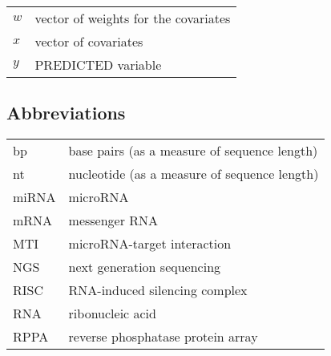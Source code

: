 \documentclass[english,12pt,a4paper,pdftex,elec,utf8]{aaltothesis}
\begin{document}
\begin{tabular}{ll}
$w$ & vector of weights for the covariates \\
$x$ & vector of covariates \\
$y$ & PREDICTED variable
\end{tabular}



\subsection*{Abbreviations}

\begin{tabular}{ll}
bp          & base pairs (as a measure of sequence length) \\
nt          & nucleotide (as a measure of sequence length) \\
miRNA       & microRNA \\
mRNA        & messenger RNA \\
MTI         & microRNA-target interaction \\
NGS         & next generation sequencing \\
RISC        & RNA-induced silencing complex \\
RNA         & ribonucleic acid \\
RPPA        & reverse phosphatase protein array
\end{tabular}
\end{document}
